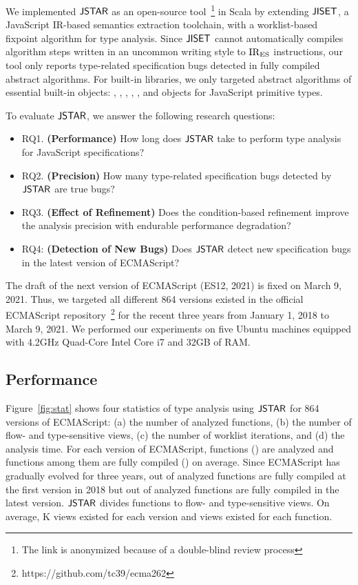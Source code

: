 We implemented $\tool$ as an open-source tool~\footnote{The link is anonymized
because of a double-blind review process} in Scala by extending $\jiset$, a
JavaScript IR-based semantics extraction toolchain, with a worklist-based
fixpoint algorithm for type analysis.  Since $\jiset$ cannot automatically
compiles algorithm steps written in an uncommon writing style to ${\text{IR}_\text{ES}}$
instructions, our tool only reports type-related specification bugs detected in
fully compiled abstract algorithms.  For built-in libraries, we only targeted
abstract algorithms of essential built-in objects: ,
, , , , and objects
for JavaScript primitive types.

To evaluate $\tool$, we answer the following research questions:
\begin{itemize}
  \item RQ1. \textbf{(Performance)} How long does $\tool$ take to perform type
    analysis for JavaScript specifications?
  \item RQ2. \textbf{(Precision)} How many type-related specification bugs
    detected by $\tool$ are true bugs?
  \item RQ3. \textbf{(Effect of Refinement)} Does the condition-based refinement
    improve the analysis precision with endurable performance degradation?
  \item RQ4: \textbf{(Detection of New Bugs)} Does $\tool$ detect new
    specification bugs in the latest version of ECMAScript?
\end{itemize}
The draft of the next version of ECMAScript (ES12, 2021) is fixed on March 9,
2021.  Thus, we targeted all different 864 versions existed in the official
ECMAScript repository~\footnote{https://github.com/tc39/ecma262} for the recent
three years from January 1, 2018 to March 9, 2021.  We performed our experiments
on five Ubuntu machines equipped with 4.2GHz Quad-Core Intel Core i7 and 32GB of
RAM.


\subsection{Performance}\label{sec:performance}

Figure~\ref{fig:stat} shows four statistics of type analysis using $\tool$ for
864 versions of ECMAScript: (a) the number of analyzed functions, (b) the number
of flow- and type-sensitive views, (c) the number of worklist iterations, and
(d) the analysis time.  For each version of ECMAScript, 
functions () are analyzed and  functions among
them are fully compiled () on average.  Since ECMAScript has
gradually evolved for three years,  out of  analyzed
functions are fully compiled at the first version in 2018 but  out
of  analyzed functions are fully compiled in the latest version.
$\tool$ divides functions to flow- and type-sensitive views.  On average,
K views existed for each version and  views existed for
each function.

